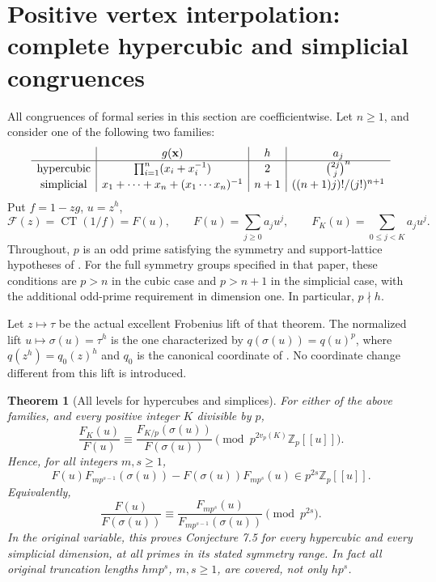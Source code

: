 \documentclass[11pt,a4paper]{article}
\newtheorem{theorem}{Theorem}[section]
\theoremstyle{definition}\newtheorem{definition}[theorem]{Definition}
\theoremstyle{remark}\newtheorem{remark}[theorem]{Remark}
\numberwithin{equation}{section}
\begin{document}
\section{Positive vertex interpolation: complete hypercubic and simplicial congruences}\label{P:source-main-2}
\label{P:sec:positive-vertex-interpolation}

All congruences of formal series in this section are coefficientwise.
Let \(n\geq1\), and consider one of the following two families:
\[
\begin{array}{c|c|c|c}
 &g({\bf x})&h&a_j\\ \hline
\text{hypercubic}
 &\prod_{i=1}^n(x_i+x_i^{-1})&2&\binom{2j}{j}^{n}\\[2pt]
\text{simplicial}
 &x_1+\cdots+x_n+(x_1\cdots x_n)^{-1}
 &n+1&((n+1)j)!/(j!)^{n+1}
\end{array}
\]
Put \(f=1-zg\), \(u=z^h\),
\[
 \mathcal F(z)=\operatorname{CT}(1/f)=F(u),\qquad
 F(u)=\sum_{j\geq0}a_ju^j,\qquad
 F_K(u)=\sum_{0\leq j<K}a_ju^j.
\]
Throughout, \(p\) is an odd prime satisfying the symmetry and
support-lattice hypotheses of \cite[Theorem 7.3]{BV3}.
For the full symmetry groups specified in that paper, these conditions
are \(p>n\) in the cubic case and \(p>n+1\) in the simplicial case,
with the additional odd-prime requirement in dimension one.
In particular, \(p\nmid h\).

Let \(z\mapsto\tau\) be the actual excellent Frobenius lift of that
theorem.  The normalized lift \(u\mapsto\sigma(u)=\tau^h\) is the
one characterized by \(q(\sigma(u))=q(u)^p\), where
\(q(z^h)=q_0(z)^h\) and \(q_0\) is the canonical coordinate
of \cite[Definition 7.14 and Proposition 9.1]{BV3}.
No coordinate change different from this lift is introduced.

\begin{theorem}[All levels for hypercubes and simplices]
\label{P:thm:positive-cube-simplex}
For either of the above families, and every positive integer \(K\)
divisible by \(p\),
\begin{equation}\label{P:eq:positive-main}
 \frac{F_K(u)}{F(u)}
 \equiv
 \frac{F_{K/p}(\sigma(u))}{F(\sigma(u))}
 \pmod{p^{2v_p(K)}\mathbb Z_p[[u]]}.
\end{equation}
Hence, for all integers \(m,s\geq1\),
\[
 F(u)F_{mp^{s-1}}(\sigma(u))
 -F(\sigma(u))F_{mp^s}(u)
 \in p^{2s}\mathbb Z_p[[u]].
\]
Equivalently,
\[
 \frac{F(u)}{F(\sigma(u))}
 \equiv
 \frac{F_{mp^s}(u)}{F_{mp^{s-1}}(\sigma(u))}
 \pmod{p^{2s}}.
\]
In the original variable, this proves Conjecture 7.5 for every
hypercubic and every simplicial dimension, at all primes in its
stated symmetry range.  In fact all original truncation lengths
\(hmp^s\), \(m,s\geq1\), are covered, not only \(hp^s\).
\end{theorem}
\end{document}
